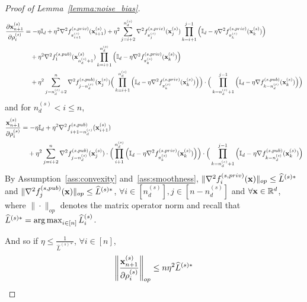 \begin{proof}[Proof of Lemma~\ref{lemma:noise_bias}]
    \begin{align}
        \frac{\partial {\mathbf{x}}_{n+1}^{(s)}}{\partial \rho_i^{(s)}}
        &= -\eta {\mathbb{I}}_d
        + \eta^2 \nabla^2 f_{\pi_{i+1}^{(s)}}^{(s, priv)}({\mathbf{x}}_{i+1}^{(s)})
        + \eta^2 \sum_{j=i+2}^{n_d^{(s)}} \nabla^2 f_{\pi_j^{(s)}}^{(s, priv)}({\mathbf{x}}_j^{(s)})
        \prod_{k=i+1}^{j-1} \Big( {\mathbb{I}}_d - \eta \nabla^2 f_{\pi_k^{(s)}}^{(s, priv)}({\mathbf{x}}_{k}^{(s)})\Big)\\
        \nonumber
        &\quad + \eta^2 \nabla^2 f_{1}^{(s, pub)}({\mathbf{x}}_{n_d^{(s)}+1}^{(s)}) \prod_{k=i+1}^{n_d^{(s)}}\Big( {\mathbb{I}}_d - \eta \nabla^2 f_{\pi_k^{(s)}}^{(s, priv)}({\mathbf{x}}_k^{(s)})\Big)\\
        \nonumber
        &\quad + \eta^2 \sum_{j=n_d^{(s)}+2}^{n} \nabla^2 f_{j-n_d^{(s)}}^{(s, pub)}({\mathbf{x}}_j^{(s)}) \Big(\prod_{k=i+1}^{n_d^{(s)}}\Big({\mathbb{I}}_d - \eta\nabla^2 f_{\pi_k^{(s)}}^{(s, priv)}({\mathbf{x}}_k^{(s)})\Big)\Big) \cdot\Big( \prod_{k=n_d^{(s)}+1}^{j-1}\Big({\mathbb{I}}_d - \eta \nabla f_{k-n_d^{(s)}}^{(s, pub)}({\mathbf{x}}_k^{(s)}) \Big) \Big)
    \end{align}
    and for $n_d^{(s)} < i \leq n$,
    \begin{align}
        \frac{{\mathbf{x}}_{n+1}^{(s)}}{\partial \rho_i^{(s)}}
        &= -\eta {\mathbb{I}}_d + \eta^2 \nabla^2 f_{i+1-n_d^{(s)}}^{(s,pub)}({\mathbf{x}}_{i+1}^{(s)})\\
        \nonumber
        &\quad + \eta^2 \sum_{j=i+2}^{n} \nabla^2 f_{j-n_d^{(s)}}^{(s,pub)}({\mathbf{x}}_j^{(s)})
        \cdot \Big(\prod_{i+1}^{n_d^{(s)}}\Big({\mathbb{I}}_d  - \eta \nabla^2 f_{\pi_k^{(s)}}^{(s,priv)}({\mathbf{x}}_k^{(s)}) \Big)\Big)
        \cdot \Big(\prod_{k=n_d^{(s)}+1}^{j-1} \Big({\mathbb{I}}_d - \eta \nabla f_{k-n_d^{(s)}}^{(s, pub)}({\mathbf{x}}_k^{(s)}) \Big)
    \end{align}
    By Assumption~\ref{ass:convexity} and~\ref{ass:smoothness}, 
    $\|\nabla^2 f_i^{(s, priv)}({\mathbf{x}})\|_{op} \leq \widehat{L}^{(s)*}$ and $\|\nabla^2 f_{j}^{(s,pub)}({\mathbf{x}})\|_{op} \leq \widehat{L}^{(s)*}$, $\forall i\in [n_d^{(s)}], j\in[n-n_d^{(s)}]$ and $\forall {\mathbf{x}}\in\mathbb{R}^d$, where $\|\cdot\|_{op}$ denotes the matrix operator norm and recall that $\widehat{L}^{(s)*} = \operatorname*{arg\,max}_{i\in[n]}\widehat{L}_i^{(s)}$.
    
    And so if $\eta \leq \frac{1}{\widehat{L}^{(s)*}}$, $\forall i \in [n]$,
    \begin{align}
    \label{eq:op_ub}
        \left\| \frac{{\mathbf{x}}_{n+1}^{(s)}}{\partial \rho_i^{(s)}} \right\|_{op}
        \leq n \eta^2 \widehat{L}^{(s)*}
    \end{align}


\end{proof}
